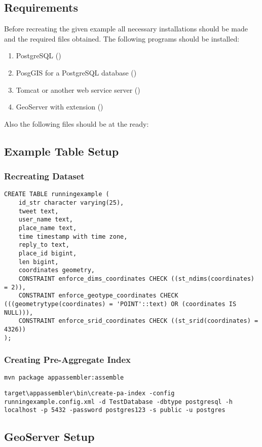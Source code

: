 
\subsection{Requirements}
Before recreating the given example all necessary installations should be made and the required files obtained. The following programs should be installed:
\begin{enumerate}
	\item PostgreSQL ()
	\item PosgGIS for a PostgreSQL database ()
	\item Tomcat or another web service server ()
	\item GeoServer with extension ()
\end{enumerate}
Also the following files should be at the ready:
\begin{enumerate}
\end{enumerate}

\subsection{Example Table Setup}
\subsubsection{Recreating Dataset}
\begin{lstlisting}
CREATE TABLE runningexample (
	id_str character varying(25),
	tweet text,
	user_name text,
	place_name text,
	time timestamp with time zone,
	reply_to text,
	place_id bigint,
	len bigint,
	coordinates geometry,
	CONSTRAINT enforce_dims_coordinates CHECK ((st_ndims(coordinates) = 2)),
	CONSTRAINT enforce_geotype_coordinates CHECK (((geometrytype(coordinates) = 'POINT'::text) OR (coordinates IS NULL))),
	CONSTRAINT enforce_srid_coordinates CHECK ((st_srid(coordinates) = 4326))
);
\end{lstlisting}

\subsubsection{Creating Pre-Aggregate Index}
\begin{lstlisting}
mvn package appassembler:assemble
\end{lstlisting}

\begin{lstlisting}
target\appassembler\bin\create-pa-index -config runningexample.config.xml -d TestDatabase -dbtype postgresql -h localhost -p 5432 -password postgres123 -s public -u postgres
\end{lstlisting}

\subsection{GeoServer Setup}
